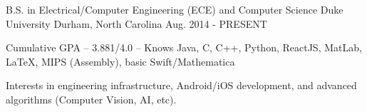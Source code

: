 \begin{cventries}
  \cventry
    {B.S. in Electrical/Computer Engineering (ECE) and Computer Science}
    {Duke University}
    {Durham, North Carolina}
    {Aug. 2014 - PRESENT}
    {
      \begin{cvitems}
        \item {Cumulative GPA -- 3.881/4.0 -- Knows Java, C, C++, Python, ReactJS, MatLab, LaTeX, MIPS (Assembly), basic Swift/Mathematica}
        \item {Interests in engineering infrastructure, Android/iOS development, and advanced algorithms (Computer Vision, AI, etc).}
      \end{cvitems}
    }
\end{cventries}
